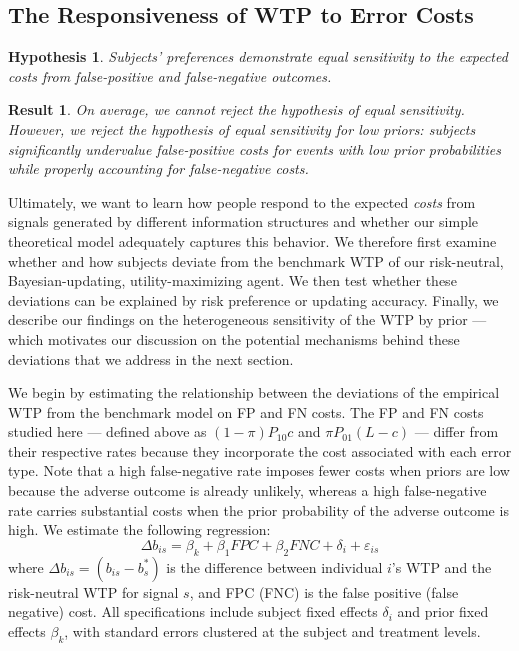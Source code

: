 \documentclass[12pt,a4paper]{article}
\newtheorem{hypothesis}{Hypothesis}
\newtheorem{result}{Result}
\begin{document}

\label{tab:wtpdis_by_stype}


\subsection{The Responsiveness of WTP to Error Costs} 

\begin{hypothesis}\label{hyp:eqSen} 
Subjects' preferences demonstrate equal sensitivity to the expected costs from false-positive and false-negative outcomes. 
\end{hypothesis}

\begin{result}
On average, we cannot reject the hypothesis of equal sensitivity.  However, we reject the hypothesis of equal sensitivity for low priors: subjects significantly undervalue false-positive costs for events with low prior probabilities while properly accounting for false-negative costs. 
\end{result}

Ultimately, we want to learn how people respond to the expected \textit{costs} from signals generated by different information structures and whether our simple theoretical model adequately captures this behavior. We therefore first examine whether and how subjects deviate from the benchmark WTP of our risk-neutral, Bayesian-updating, utility-maximizing agent. We then test whether these deviations can be explained by risk preference or updating accuracy. Finally, we describe our findings on the heterogeneous sensitivity of the WTP by prior --- which motivates our discussion on the potential mechanisms behind these deviations that we address in the next section.

We begin by estimating the relationship between the deviations of the empirical WTP from the benchmark model on FP and FN costs. The FP and FN costs studied here --- defined above as $(1-\pi) P_{10}c$ and $\pi P_{01}(L-c)$ --- differ from their respective rates because they incorporate the cost associated with each error type. Note that a high false-negative rate imposes fewer costs when priors are low because the adverse outcome is already unlikely, whereas a high false-negative rate carries substantial costs when the prior probability of the adverse outcome is high. We estimate the following regression:
\[\Delta b_{is} = \beta_k + \beta_1 FPC + \beta_2 FNC + \delta_i + \varepsilon_{is}\]
where $\Delta b_{is} = (b_{is} - b^*_s)$ is the difference between individual $i$'s WTP and the risk-neutral WTP for signal $s$, and FPC (FNC) is the false positive (false negative) cost. All specifications include subject fixed effects $\delta_i$ and prior fixed effects $\beta_k$, with standard errors clustered at the subject and treatment levels.
\end{document}
